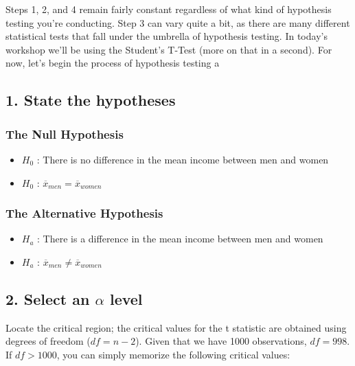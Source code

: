 \documentclass[
  letterpaper,
  DIV=11,
  numbers=noendperiod]{scrreprt}
\providecommand{\tightlist}{%
  \setlength{\itemsep}{0pt}\setlength{\parskip}{0pt}}\usepackage{longtable,booktabs,array}
\begin{document}
Steps 1, 2, and 4 remain fairly constant regardless of what kind of
hypothesis testing you're conducting. Step 3 can vary quite a bit, as
there are many different statistical tests that fall under the umbrella
of hypothesis testing. In today's workshop we'll be using the Student's
T-Test (more on that in a second). For now, let's begin the process of
hypothesis testing a

\hypertarget{state-the-hypotheses}{%
\subsection{1. State the hypotheses}\label{state-the-hypotheses}}

\hypertarget{the-null-hypothesis}{%
\subsubsection{The Null Hypothesis}\label{the-null-hypothesis}}

\begin{itemize}
\tightlist
\item
  \(H_0\) : There is no difference in the mean income between men and
  women
\item
  \(H_0\) : \(\overline{x}_{men} = \overline{x}_{women}\)
\end{itemize}

\hypertarget{the-alternative-hypothesis}{%
\subsubsection{The Alternative
Hypothesis}\label{the-alternative-hypothesis}}

\begin{itemize}
\tightlist
\item
  \(H_a\) : There is a difference in the mean income between men and
  women
\item
  \(H_a\) : \(\overline{x}_{men} \neq \overline{x}_{women}\)
\end{itemize}

\hypertarget{select-an-alpha-level}{%
\subsection{\texorpdfstring{2. Select an \(\alpha\)
level}{2. Select an \textbackslash alpha level}}\label{select-an-alpha-level}}

Locate the critical region; the critical values for the t statistic are
obtained using degrees of freedom (\(df=n-2\)). Given that we have 1000
observations, \(df=998\). If \(df>1000\), you can simply memorize the
following critical values:
\end{document}
